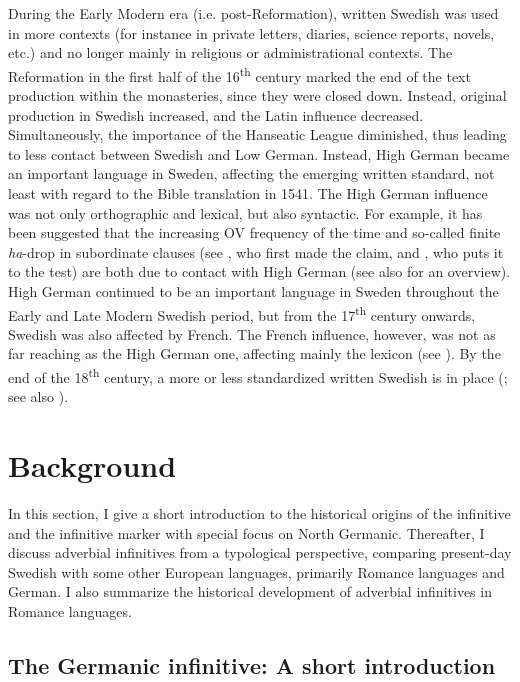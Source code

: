 \documentclass[output=paper]{langscibook}
\begin{document}
During the Early Modern era (i.e. post-Reformation), written Swedish was used in more contexts (for instance in private letters, diaries, science reports, novels, etc.) and no longer mainly in religious or administrational contexts. The Reformation in the first half of the 16\textsuperscript{th} century marked the end of the text production within the monasteries, since they were closed down. Instead, original production in Swedish increased, and the Latin influence decreased. Simultaneously, the importance of the Hanseatic League diminished, thus leading to less contact between Swedish and Low German. Instead, High German became an important language in Sweden, affecting the emerging written standard, not least with regard to the Bible translation in 1541. The High German influence was not only orthographic and lexical, but also syntactic. For example, it has been suggested that the increasing OV frequency of the time \citep{Petzell2011} and so-called finite \textit{ha}{}-drop in subordinate clauses (see \citealt{Johannisson1945}, who first made the claim, and \citealt{Backstrom2019}, who puts it to the test) are both due to contact with High German (see also \citealt{Braunmuller2005} for an overview). High German continued to be an important language in Sweden throughout the Early and Late Modern Swedish period, but from the 17\textsuperscript{th} century onwards, Swedish was also affected by French. The French influence, however, was not as far reaching as the High German one, affecting mainly the lexicon (see \citealt{Gellerstam2005}). By the end of the 18\textsuperscript{th} century, a more or less standardized written Swedish is in place (\citealt{Teleman2002}; see also ).


\section{Background}\label{sec:kalm:3}


In this section, I give a short introduction to the historical origins of the infinitive and the infinitive marker with special focus on North Germanic. Thereafter, I discuss adverbial infinitives from a typological perspective, comparing present-day Swedish with some other European languages, primarily Romance languages and German. I also summarize the historical development of adverbial infinitives in Romance languages. 


\subsection{The Germanic infinitive: A short introduction}\label{sec:kalm:3.1}
\end{document}
